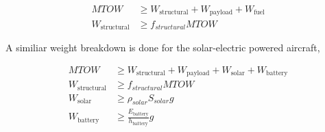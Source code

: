 \documentclass[]{aiaa-tc}%
\begin{document}
\begin{align}
    \label{e:weightmtow}
    MTOW &\geq W_{\text{structural}}  + W_{\text{payload}} + W_{\text{fuel}} \\
    \label{e:weightfst}
    W_{\text{structural}} &\geq f_{structural}MTOW
\end{align}

A similiar weight breakdown is done for the solar-electric powered aircraft, 

\begin{align}
    \label{e:weightsmtow}
    MTOW &\geq W_{\text{structural}} + W_{\text{payload}} + W_{\text{solar}} + W_{\text{battery}} \\
    W_{\text{structural}} &\geq f_{structural}MTOW \\
    W_{\text{solar}} &\geq \rho_{solar} S_{solar} g \\
    W_{\text{battery}} &\geq \frac{E_{\text{battery}}}{h_{\text{battery}}} g
\end{align}
\end{document}
